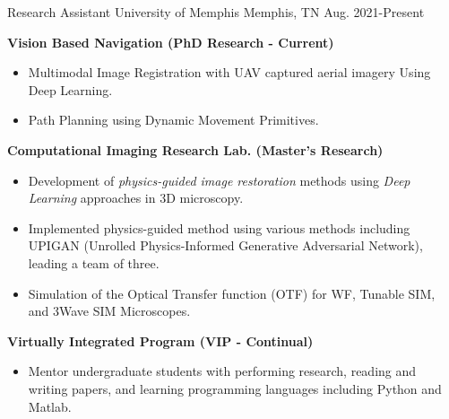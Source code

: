 

\begin{cventries}

  \cventry
    {Research Assistant} %
    {University of Memphis} %
    {Memphis, TN} %
    {Aug. 2021-Present} %
    {
      \begin{cvitems} %
      \item{\textbf{Vision Based Navigation (PhD Research - Current)}}
      \begin{itemize}[label= - ]
                \item Multimodal Image Registration with UAV captured aerial imagery Using Deep Learning.
                \item Path Planning using Dynamic Movement Primitives.
        \end{itemize}   
      \item{\textbf{Computational Imaging Research Lab. (Master's Research)}}
      \begin{itemize}[label= - ]
                \item{Development of \textit{physics-guided image restoration} methods using \textit{Deep Learning} approaches in 3D microscopy.}
                \item{Implemented physics-guided method using various methods including UPIGAN (Unrolled Physics-Informed Generative Adversarial Network), leading a team of three.}
              \item{Simulation of the Optical Transfer function (OTF) for WF, Tunable SIM, and 3Wave SIM Microscopes.}
        \end{itemize}    
        \item{\textbf{Virtually Integrated Program (VIP - Continual)}}
        \begin{itemize}
              \item {Mentor undergraduate students with performing research, reading and writing papers, and learning programming languages including Python and Matlab.}
        \end{itemize}
      \end{cvitems}
    }


\end{cventries}
